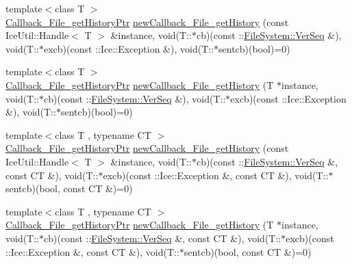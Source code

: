 \begin{DoxyCompactItemize}
\item 
{\footnotesize template$<$class T $>$ }\\\hyperlink{namespace_file_system_a9dca00d90979e9c64452fc4123feed8e}{Callback\+\_\+\+File\+\_\+get\+History\+Ptr} \hyperlink{namespace_file_system_a9c85bcf49db4963463099447f95e0dab}{new\+Callback\+\_\+\+File\+\_\+get\+History} (const Ice\+Util\+::\+Handle$<$ T $>$ \&instance, void(T\+::$\ast$cb)(const \+::\hyperlink{namespace_file_system_ac32dc1eb34c060160b52edc7c4e37d6e}{File\+System\+::\+Ver\+Seq} \&), void(T\+::$\ast$excb)(const \+::Ice\+::\+Exception \&), void(T\+::$\ast$sentcb)(bool)=0)
\item 
{\footnotesize template$<$class T $>$ }\\\hyperlink{namespace_file_system_a9dca00d90979e9c64452fc4123feed8e}{Callback\+\_\+\+File\+\_\+get\+History\+Ptr} \hyperlink{namespace_file_system_ad5d2a7211c35dfd59a100b8672b42fae}{new\+Callback\+\_\+\+File\+\_\+get\+History} (T $\ast$instance, void(T\+::$\ast$cb)(const \+::\hyperlink{namespace_file_system_ac32dc1eb34c060160b52edc7c4e37d6e}{File\+System\+::\+Ver\+Seq} \&), void(T\+::$\ast$excb)(const \+::Ice\+::\+Exception \&), void(T\+::$\ast$sentcb)(bool)=0)
\item 
{\footnotesize template$<$class T , typename C\+T $>$ }\\\hyperlink{namespace_file_system_a9dca00d90979e9c64452fc4123feed8e}{Callback\+\_\+\+File\+\_\+get\+History\+Ptr} \hyperlink{namespace_file_system_a452d710fbcda80656c790b9c5fd63518}{new\+Callback\+\_\+\+File\+\_\+get\+History} (const Ice\+Util\+::\+Handle$<$ T $>$ \&instance, void(T\+::$\ast$cb)(const \+::\hyperlink{namespace_file_system_ac32dc1eb34c060160b52edc7c4e37d6e}{File\+System\+::\+Ver\+Seq} \&, const C\+T \&), void(T\+::$\ast$excb)(const \+::Ice\+::\+Exception \&, const C\+T \&), void(T\+::$\ast$sentcb)(bool, const C\+T \&)=0)
\item 
{\footnotesize template$<$class T , typename C\+T $>$ }\\\hyperlink{namespace_file_system_a9dca00d90979e9c64452fc4123feed8e}{Callback\+\_\+\+File\+\_\+get\+History\+Ptr} \hyperlink{namespace_file_system_acaebd2ccc7b6507ce9791aa62af99829}{new\+Callback\+\_\+\+File\+\_\+get\+History} (T $\ast$instance, void(T\+::$\ast$cb)(const \+::\hyperlink{namespace_file_system_ac32dc1eb34c060160b52edc7c4e37d6e}{File\+System\+::\+Ver\+Seq} \&, const C\+T \&), void(T\+::$\ast$excb)(const \+::Ice\+::\+Exception \&, const C\+T \&), void(T\+::$\ast$sentcb)(bool, const C\+T \&)=0)
\end{DoxyCompactItemize}


